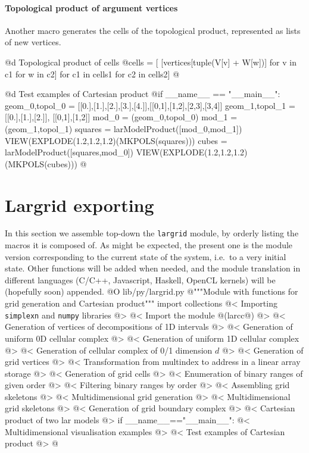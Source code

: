 \documentclass[11pt,oneside]{article}	%
\begin{document}
\paragraph{Topological product of argument vertices}
Another macro generates the cells of the topological product, represented as lists of new vertices. 

@d Topological product of cells    
@{cells = [ [vertices[tuple(V[v] + W[w])] for v in c1 for w in c2]
         for c1 in cells1 for c2 in cells2]	@}


@d Test examples of Cartesian product
@{if __name__ == "__main__":
    geom_0,topol_0 = [[0.],[1.],[2.],[3.],[4.]],[[0,1],[1,2],[2,3],[3,4]]
    geom_1,topol_1 = [[0.],[1.],[2.]], [[0,1],[1,2]]
    mod_0 = (geom_0,topol_0)
    mod_1 = (geom_1,topol_1)
    squares = larModelProduct([mod_0,mod_1])
    VIEW(EXPLODE(1.2,1.2,1.2)(MKPOLS(squares)))
    cubes = larModelProduct([squares,mod_0])
    VIEW(EXPLODE(1.2,1.2,1.2)(MKPOLS(cubes)))
@}



\section{Largrid exporting}
\label{sec:largrid}
In this section we assemble top-down the \texttt{largrid} module, by orderly listing the macros it is composed of. As might be expected, the present one is the module version corresponding to the current state of the system, i.e.~to a very initial state. Other functions will be added when needed, and the module translation in different languages (C/C++, Javascript, Haskell, OpenCL kernels) will be (hopefully soon) appended.
@O lib/py/largrid.py
@{"""Module with functions for grid generation and Cartesian product"""
import collections
@< Importing \texttt{simplexn} and \texttt{numpy} libraries @>
@< Import the module @(larcc@) @>
@< Generation of vertices of decompositions of 1D intervals  @>
@< Generation of uniform 0D cellular complex  @>
@< Generation of uniform 1D cellular complex  @>
@< Generation of cellular complex of 0/1 dimension $d$ @>
@< Generation of grid vertices  @>
@< Transformation from multindex to address in a linear array storage @>
@< Generation of grid cells  @>
@< Enumeration of binary ranges of given order @>
@< Filtering binary ranges by order @>
@< Assembling grid skeletons @>
@< Multidimensional grid generation @>
@< Multidimensional grid skeletons @>
@< Generation of grid boundary complex @>
@< Cartesian product of two lar models   @>
if __name__=="__main__":
	@< Multidimensional visualisation examples @>
	@< Test examples of Cartesian product @>
@}
\end{document}
